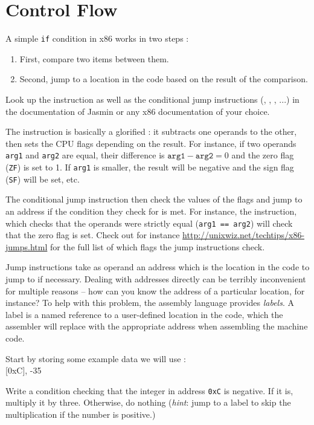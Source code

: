 \documentclass{../../tp}
\begin{document}
\section{Control Flow}

A simple \texttt{if} condition in x86 works in two steps : 
\begin{enumerate}
	\item First, compare two items between them.
	\item Second, jump to a location in the code based on the result of the comparison.
\end{enumerate}

Look up the  instruction as well as the conditional jump instructions (, , , ...) in the documentation of \textsf{Jasmin} or any x86 documentation of your choice.

The  instruction is basically a glorified : it subtracts one operands to the other, then sets the CPU flags depending on the result. For instance, if two operands \texttt{arg1} and \texttt{arg2} are equal, their difference is  $\texttt{arg1} - \texttt{arg2} = 0$ and the zero flag (\texttt{ZF}) is set to 1. If \texttt{arg1} is smaller, the result will be negative and the sign flag (\texttt{SF}) will be set, etc.

The conditional jump instruction then check the values of the flags and jump to an address if the condition they check for is met. For instance, the  instruction, which checks that the operands were strictly equal (\texttt{arg1 == arg2}) will check that the zero flag is set. Check out for instance \url{http://unixwiz.net/techtips/x86-jumps.html} for the full list of which flags the jump instructions check.

Jump instructions take as operand an address which is the location in the code to jump to if necessary. Dealing with addresses directly can be terribly inconvenient for multiple reasons -- how can you know the address of a particular location, for instance? To help with this problem, the assembly language provides \emph{labels}. A label is a named reference to a user-defined location in the code, which the assembler will replace with the appropriate address when assembling the machine code. 

\begin{instruction}
	
	Start by storing some example data we will use :\\
	
	{\ttfamily {} [0xC], -35 \\}
	
	Write a condition checking that the integer in address \texttt{0xC} is negative. If it is, multiply it by three. Otherwise, do nothing (\emph{hint}: jump to a label to skip the multiplication if the number is positive.)

\end{instruction}
\end{document}
